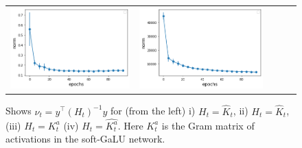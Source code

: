 \begin{figure}
{\begin{tabular}{ccccc}
\includegraphics[scale=0.18]{figs/activation-gram-unnorm.png}
&
\includegraphics[scale=0.18]{figs/activation-gram-norm.png}
\end{tabular}
}
\caption{Shows $\nu_t=y^\top (H_t)^{-1}y$ for (from the left) i) $H_t=\widehat{K}_t$, ii) $H_t=\widehat{K}_t$,  (iii) $H_t=K^a_t$ (iv) $H_t=\widehat{K^a_t}$. Here $K^a_t$ is the Gram matrix of activations in the soft-GaLU network.}
\label{fig:adapt-norm}
\end{figure}

